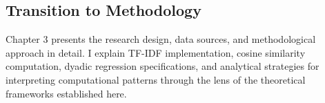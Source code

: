 \subsection{Transition to Methodology}

Chapter 3 presents the research design, data sources, and methodological approach in detail. I explain TF-IDF implementation, cosine similarity computation, dyadic regression specifications, and analytical strategies for interpreting computational patterns through the lens of the theoretical frameworks established here.
